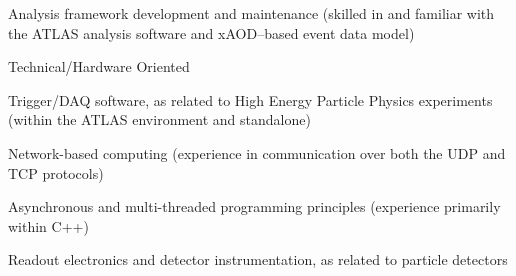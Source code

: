 \begin{minipage}{0.8\textwidth}
\begin{minipage}{0.8\textwidth}
\begin{minipage}{0.8\textwidth}
	\vspace{0.1in}
	\hspace{0.15in}
    \begin{minipage}{\textwidth}
	Analysis framework development and maintenance (skilled in and familiar with the ATLAS analysis software and xAOD--based event data model)
    \end{minipage}

    \vspace{0.1in}
    \hspace{0.15in}
    \begin{minipage}{\textwidth}
    \end{minipage}

\end{minipage}

\hspace{0.2in}
Technical/Hardware Oriented

\vspace{0.1in}
\hspace{0.2in}
\begin{minipage}{0.8\textwidth}


    \vspace{0.1in}
    \hspace{0.15in}
    \begin{minipage}{\textwidth}
    Trigger/DAQ software, as related to High Energy Particle Physics experiments (within the ATLAS environment and standalone)
    \end{minipage}

    \vspace{0.1in}
    \hspace{0.15in}
    \begin{minipage}{\textwidth}
    Network-based computing (experience in communication over both the UDP and TCP protocols)
    \end{minipage}

    \vspace{0.1in}
    \hspace{0.15in}
    \begin{minipage}{\textwidth}
    Asynchronous and multi-threaded programming principles (experience primarily within C++)
    \end{minipage}

    \vspace{0.1in}
    \hspace{0.15in}
    \begin{minipage}{\textwidth}
    Readout electronics and detector instrumentation, as related to particle detectors
    \end{minipage}


\end{minipage}
\end{minipage}
\end{minipage}
